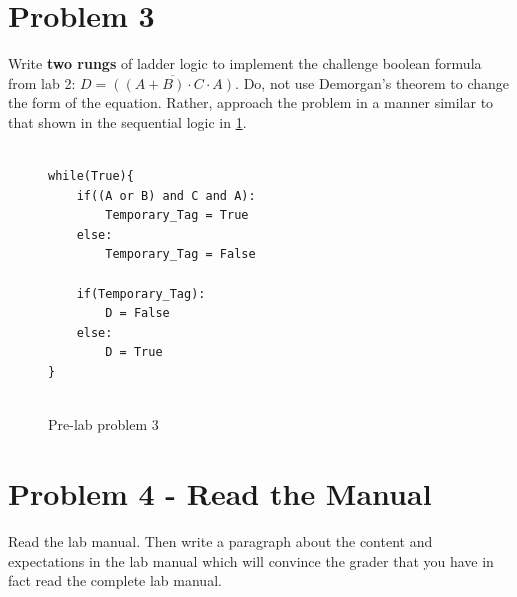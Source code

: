 \section{Problem 3}

Write \textbf{two rungs} of ladder logic to implement the challenge boolean formula from lab 2: $D = \overline{((A+B)\cdot C\cdot A)}$. Do, not use Demorgan's theorem to change the form of the equation. Rather, approach the problem in a manner similar to that shown in the sequential logic in \figureautorefname \ref{fig:Problem3_pl2}.

\lstset{style=mystyle}
\lstset{language=python}
\begin{figure}[h]
\begin{lstlisting}[firstnumber=1]

while(True){
    if((A or B) and C and A):
        Temporary_Tag = True
    else:
        Temporary_Tag = False
        
    if(Temporary_Tag):
        D = False
    else:
        D = True
}
    
\end{lstlisting}
\caption{Pre-lab problem 3}
\label{fig:Problem3_pl2}
\end{figure}

\section{Problem 4 - Read the Manual}

Read the lab manual. Then write a paragraph about the content and expectations in the lab manual which will convince the grader that you have in fact read the complete lab manual.